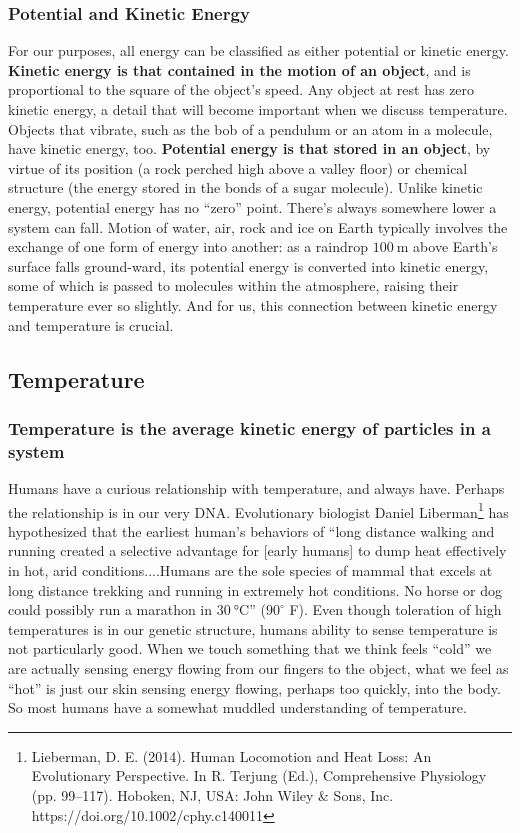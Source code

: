 \documentclass[amstex,12pt]{book}
\begin{document}
\subsubsection{Potential and Kinetic Energy}
For our purposes, all energy can be classified as either potential or kinetic energy. \textbf{Kinetic energy is that contained in the motion of an object}, and is proportional to the square of the object's speed. Any object at rest has zero kinetic energy, a detail that will become important when we discuss temperature. Objects that vibrate, such as the bob of a pendulum or an atom in a molecule, have kinetic energy, too. \textbf{Potential energy is that stored in an object}, by virtue of its position (a rock perched high above a valley floor) or chemical structure (the energy stored in the bonds of a sugar molecule). Unlike kinetic energy, potential energy has no ``zero'' point. There's always somewhere lower a system can fall. Motion of water, air, rock and ice on Earth typically involves the exchange of one form of energy into another: as a raindrop $\SI{100}{\meter}$ above Earth's surface falls ground-ward, its potential energy is converted into kinetic energy, some of which is passed to molecules within the atmosphere, raising their temperature ever so slightly. And for us, this connection between kinetic energy and temperature is crucial.

\subsection{Temperature}
\subsubsection{Temperature is the average kinetic energy of particles in a system}
Humans have a curious relationship with temperature, and always have. Perhaps the relationship is in our very DNA. Evolutionary biologist Daniel Liberman\footnote{Lieberman, D. E. (2014). Human Locomotion and Heat Loss: An Evolutionary Perspective. In R. Terjung (Ed.), Comprehensive Physiology (pp. 99–117). Hoboken, NJ, USA: John Wiley \& Sons, Inc. https://doi.org/10.1002/cphy.c140011} has hypothesized that the earliest human's behaviors of ``long distance walking and running created a selective advantage for [early humans] to dump heat effectively in hot, arid conditions....Humans are the sole species of mammal that excels at long distance trekking and running in extremely hot conditions. No horse or dog could possibly run a marathon in $\SI{30}{\degreeCelsius}$'' ($90^{\circ}$ F). Even though toleration of high temperatures is in our genetic structure, humans ability to sense temperature is not particularly good. When we touch something that we think feels ``cold'' we are actually sensing energy flowing from our fingers to the object, what we feel as ``hot'' is just our skin sensing energy flowing, perhaps too quickly, into the body. So most humans have a somewhat muddled understanding of temperature.\\
\end{document}
